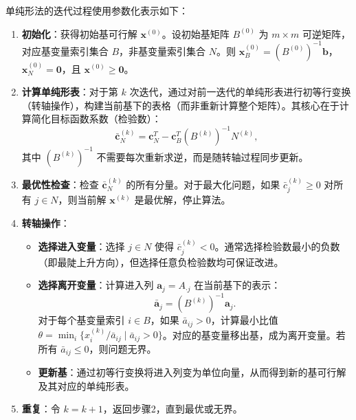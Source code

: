 \documentclass[12pt]{article}
\theoremstyle{plain}
\theoremstyle{definition}
\begin{document}
单纯形法的迭代过程使用参数化表示如下：

\begin{enumerate}
    \item \textbf{初始化}：获得初始基可行解 $\bm{x}^{(0)}$。设初始基矩阵 $B^{(0)}$ 为 $m \times m$ 可逆矩阵，对应基变量索引集合 $B$，非基变量索引集合 $N$。则 $\bm{x}_B^{(0)} = (B^{(0)})^{-1} \bm{b}$，$\bm{x}_N^{(0)} = \bm{0}$，且 $\bm{x}^{(0)} \geq \bm{0}$。

    \item \textbf{计算单纯形表}：对于第 $k$ 次迭代，通过对前一迭代的单纯形表进行初等行变换（转轴操作），构建当前基下的表格（而非重新计算整个矩阵）。其核心在于计算简化目标函数系数（检验数）：
    \[
    \bar{\bm{c}}_N^{(k)} = \bm{c}_N^T - \bm{c}_B^T (B^{(k)})^{-1} N^{(k)},
    \]
    其中 $(B^{(k)})^{-1}$ 不需要每次重新求逆，而是随转轴过程同步更新。

    \item \textbf{最优性检查}：检查 $\bar{\bm{c}}_N^{(k)}$ 的所有分量。对于最大化问题，如果 $\bar{c}_j^{(k)} \geq 0$ 对所有 $j \in N$，则当前解 $\bm{x}^{(k)}$ 是最优解，停止算法。

    \item \textbf{转轴操作}：
    \begin{itemize}
        \item \textbf{选择进入变量}：选择 $j \in N$ 使得 $\bar{c}_j^{(k)} < 0$。通常选择检验数最小的负数（即最陡上升方向），但选择任意负检验数均可保证改进。
        \item \textbf{选择离开变量}：计算进入列 $\bm{a}_j = A_{\cdot j}$ 在当前基下的表示：
        \[
        \bar{\bm{a}}_j = (B^{(k)})^{-1} \bm{a}_j.
        \]
        对于每个基变量索引 $i \in B$，如果 $\bar{a}_{i j} > 0$，计算最小比值 $\theta = \min_{i} \{x_i^{(k)} / \bar{a}_{i j} \mid \bar{a}_{i j} > 0\}$。对应的基变量移出基，成为离开变量。若所有 $\bar{a}_{i j} \leq 0$，则问题无界。
        \item \textbf{更新基}：通过初等行变换将进入列变为单位向量，从而得到新的基可行解及其对应的单纯形表。
    \end{itemize}
    \item \textbf{重复}：令 $k = k+1$，返回步骤2，直到最优或无界。
\end{enumerate}
\end{document}

